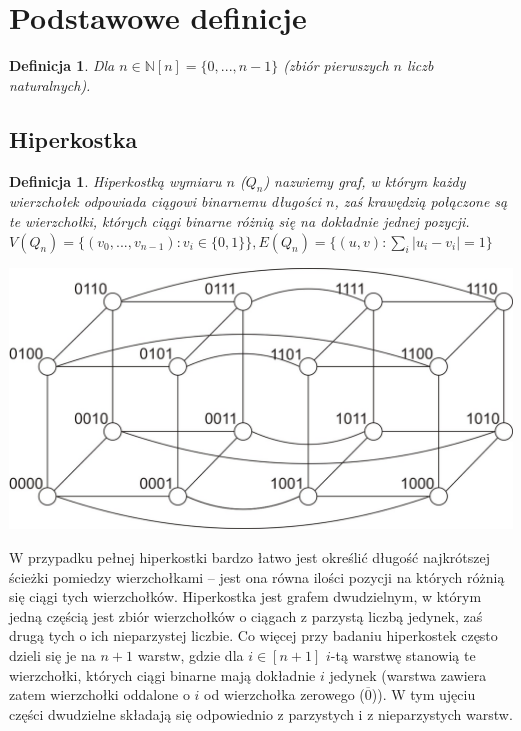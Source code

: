 \documentclass{pracamgr}
\newtheorem{defi}[theorem]{Definicja} %
\begin{document}
  \section{Podstawowe definicje}
   \begin{defi}\label{[n]}
    Dla $n\in\mathbb{N}$\quad $[n]=\{0,...,n-1\}$ (zbiór pierwszych $n$ liczb naturalnych).
   \end{defi}
   \subsection{Hiperkostka}
    \begin{defi}\label{hiperkostka}
     \emph{Hiperkostką wymiaru $n$ ($Q_n$)} nazwiemy graf, w którym każdy wierzchołek odpowiada ciągowi binarnemu długości $n$,
     zaś krawędzią połączone są te wierzchołki, których ciągi binarne różnią się na dokładnie jednej pozycji.\newline
     $V(Q_n)=\{(v_0,...,v_{n-1}):v_i\in\{0,1\}\}, E(Q_n)=\{(u,v):\sum_{i}|u_i-v_i|=1\}$
    \end{defi}
    \begin{center}
     \includegraphics[scale=0.6]{img/Q_4.jpg}
    \end{center}
    W przypadku pełnej hiperkostki
    bardzo łatwo jest określić długość najkrótszej ścieżki pomiedzy wierzchołkami --
    jest ona równa ilości pozycji na których różnią się ciągi tych wierzchołków.\newline
    Hiperkostka jest grafem dwudzielnym, w którym jedną częścią jest zbiór wierzchołków o ciągach z parzystą liczbą jedynek,
    zaś drugą tych o ich nieparzystej liczbie.\newline
    Co więcej przy badaniu hiperkostek często dzieli się je na $n+1$ warstw, gdzie dla $i\in[n+1]$ $i$-tą warstwę stanowią te wierzchołki,
    których ciągi binarne mają dokładnie $i$ jedynek (warstwa zawiera zatem wierzchołki oddalone o $i$ od wierzchołka zerowego ($\overline{0}$)).
    W tym ujęciu części dwudzielne składają się odpowiednio z parzystych i z nieparzystych warstw.
    
\end{document}
